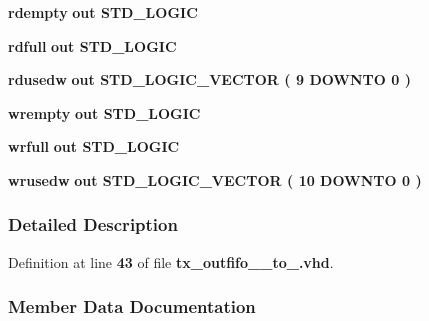 \begin{DoxyCompactItemize}
\item 
{\bf rdempty}  {\bfseries {\bfseries \textcolor{keywordflow}{out}\textcolor{vhdlchar}{ }}} {\bfseries \textcolor{comment}{S\+T\+D\+\_\+\+L\+O\+G\+IC}\textcolor{vhdlchar}{ }} 
\item 
{\bf rdfull}  {\bfseries {\bfseries \textcolor{keywordflow}{out}\textcolor{vhdlchar}{ }}} {\bfseries \textcolor{comment}{S\+T\+D\+\_\+\+L\+O\+G\+IC}\textcolor{vhdlchar}{ }} 
\item 
{\bf rdusedw}  {\bfseries {\bfseries \textcolor{keywordflow}{out}\textcolor{vhdlchar}{ }}} {\bfseries \textcolor{comment}{S\+T\+D\+\_\+\+L\+O\+G\+I\+C\+\_\+\+V\+E\+C\+T\+OR}\textcolor{vhdlchar}{ }\textcolor{vhdlchar}{(}\textcolor{vhdlchar}{ }\textcolor{vhdlchar}{ } \textcolor{vhdldigit}{9} \textcolor{vhdlchar}{ }\textcolor{keywordflow}{D\+O\+W\+N\+TO}\textcolor{vhdlchar}{ }\textcolor{vhdlchar}{ } \textcolor{vhdldigit}{0} \textcolor{vhdlchar}{ }\textcolor{vhdlchar}{)}\textcolor{vhdlchar}{ }} 
\item 
{\bf wrempty}  {\bfseries {\bfseries \textcolor{keywordflow}{out}\textcolor{vhdlchar}{ }}} {\bfseries \textcolor{comment}{S\+T\+D\+\_\+\+L\+O\+G\+IC}\textcolor{vhdlchar}{ }} 
\item 
{\bf wrfull}  {\bfseries {\bfseries \textcolor{keywordflow}{out}\textcolor{vhdlchar}{ }}} {\bfseries \textcolor{comment}{S\+T\+D\+\_\+\+L\+O\+G\+IC}\textcolor{vhdlchar}{ }} 
\item 
{\bf wrusedw}  {\bfseries {\bfseries \textcolor{keywordflow}{out}\textcolor{vhdlchar}{ }}} {\bfseries \textcolor{comment}{S\+T\+D\+\_\+\+L\+O\+G\+I\+C\+\_\+\+V\+E\+C\+T\+OR}\textcolor{vhdlchar}{ }\textcolor{vhdlchar}{(}\textcolor{vhdlchar}{ }\textcolor{vhdlchar}{ } \textcolor{vhdldigit}{10} \textcolor{vhdlchar}{ }\textcolor{keywordflow}{D\+O\+W\+N\+TO}\textcolor{vhdlchar}{ }\textcolor{vhdlchar}{ } \textcolor{vhdldigit}{0} \textcolor{vhdlchar}{ }\textcolor{vhdlchar}{)}\textcolor{vhdlchar}{ }} 
\end{DoxyCompactItemize}


\subsubsection{Detailed Description}


Definition at line {\bf 43} of file {\bf tx\+\_\+outfifo\+\_\+\_\+to\+\_.\+vhd}.



\subsubsection{Member Data Documentation}
